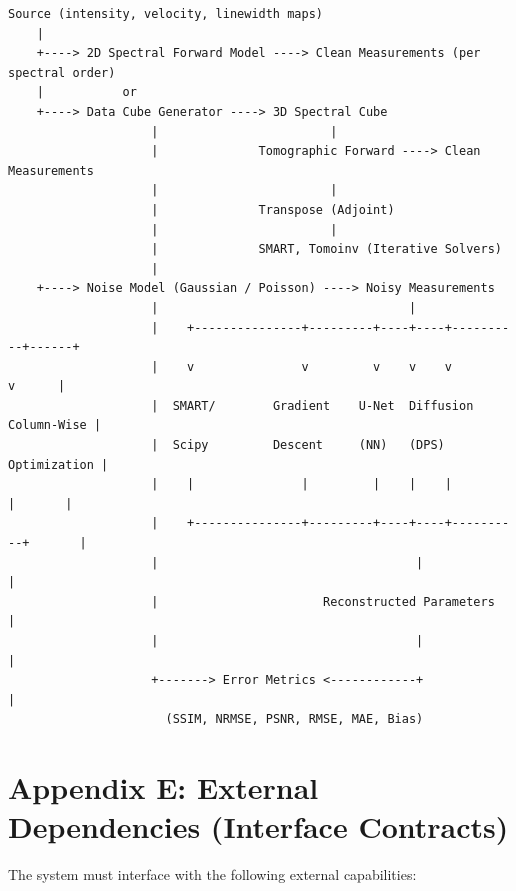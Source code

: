 \documentclass[11pt,a4paper]{article}
\begin{document}
\begin{verbatim}
Source (intensity, velocity, linewidth maps)
    |
    +----> 2D Spectral Forward Model ----> Clean Measurements (per spectral order)
    |           or
    +----> Data Cube Generator ----> 3D Spectral Cube
                    |                        |
                    |              Tomographic Forward ----> Clean Measurements
                    |                        |
                    |              Transpose (Adjoint)
                    |                        |
                    |              SMART, Tomoinv (Iterative Solvers)
                    |
    +----> Noise Model (Gaussian / Poisson) ----> Noisy Measurements
                    |                                   |
                    |    +---------------+---------+----+----+----------+------+
                    |    v               v         v    v    v          v      |
                    |  SMART/        Gradient    U-Net  Diffusion    Column-Wise |
                    |  Scipy         Descent     (NN)   (DPS)       Optimization |
                    |    |               |         |    |    |          |       |
                    |    +---------------+---------+----+----+----------+       |
                    |                                    |                      |
                    |                       Reconstructed Parameters           |
                    |                                    |                      |
                    +-------> Error Metrics <------------+                      |
                      (SSIM, NRMSE, PSNR, RMSE, MAE, Bias)
\end{verbatim}

\section{Appendix E: External Dependencies (Interface Contracts)}

The system must interface with the following external capabilities:
\end{document}
